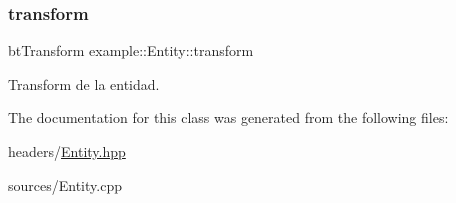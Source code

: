 \subsubsection{\texorpdfstring{transform}{transform}}
{\footnotesize\ttfamily bt\+Transform example\+::\+Entity\+::transform\hspace{0.3cm}{\ttfamily [protected]}}



Transform de la entidad. 



The documentation for this class was generated from the following files\+:\begin{DoxyCompactItemize}
\item 
headers/\mbox{\hyperlink{_entity_8hpp}{Entity.\+hpp}}\item 
sources/Entity.\+cpp\end{DoxyCompactItemize}

